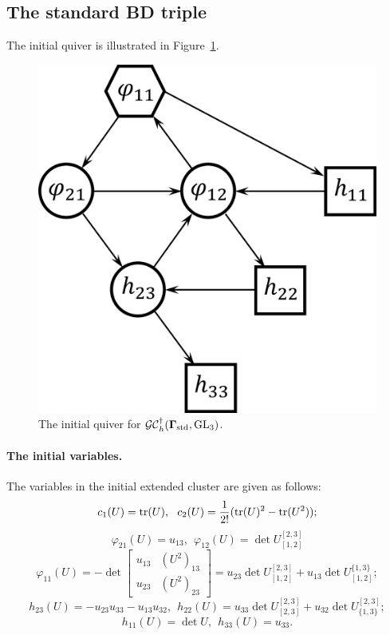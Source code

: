 \subsection{The standard BD triple}
The initial quiver is illustrated in Figure~\ref{f:h_n=3_std}. 
\begin{figure}[htb]
\begin{center}
\includegraphics[scale=0.65]{h_convention/h_n=3_std.png}
\end{center}
\caption{The initial quiver for $\mathcal{GC}_h^{\dagger}(\mathbf{\Gamma}_{\text{std}},\operatorname{GL}_3)$. }
\label{f:h_n=3_std}
\end{figure}

\paragraph{The initial variables.} The variables in the initial extended cluster are given as follows:
\begin{equation}
    c_1(U) = \operatorname{tr}(U), \ \ c_2(U) = \frac{1}{2!} (\operatorname{tr}(U)^2 - \operatorname{tr}(U^2));
\end{equation}
\begin{equation}
    \varphi_{21}(U) = u_{13}, \ \ \varphi_{12}(U) = \det U^{[2,3]}_{[1,2]}\end{equation}\begin{equation}\varphi_{11}(U) = -\det \begin{bmatrix} u_{13} &(U^2)_{13}\\ u_{23} & (U^2)_{23}\end{bmatrix} =  u_{23}\det U^{[2,3]}_{[1,2]} + u_{13}\det U^{\{1,3\}}_{[1,2]};
\end{equation}
\begin{equation}
    h_{23}(U) = -u_{23}u_{33}-u_{13}u_{32}, \ \ h_{22}(U) = u_{33}\det U^{[2,3]}_{[2,3]} + u_{32}\det U^{[2,3]}_{\{1,3\}};
\end{equation}
\begin{equation}
    h_{11}(U) = \det U, \ \ h_{33}(U) = u_{33}.
\end{equation}

